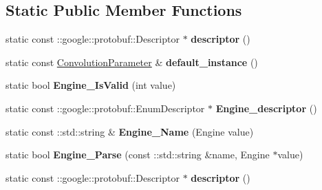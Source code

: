 \subsection*{Static Public Member Functions}
\begin{DoxyCompactItemize}
\item 
\mbox{\label{classcaffe_1_1_convolution_parameter_aff287042d46a7801d37412e6552ec762}} 
static const \+::google\+::protobuf\+::\+Descriptor $\ast$ {\bfseries descriptor} ()
\item 
\mbox{\label{classcaffe_1_1_convolution_parameter_a5b99741cbe94b140c5499713cdbb4c7e}} 
static const \mbox{\hyperlink{classcaffe_1_1_convolution_parameter}{Convolution\+Parameter}} \& {\bfseries default\+\_\+instance} ()
\item 
\mbox{\label{classcaffe_1_1_convolution_parameter_a19b2ca3da6c78edc6a7cdc7eee884a73}} 
static bool {\bfseries Engine\+\_\+\+Is\+Valid} (int value)
\item 
\mbox{\label{classcaffe_1_1_convolution_parameter_a23a4f2961e4f9f02ca0d27d39406fd69}} 
static const \+::google\+::protobuf\+::\+Enum\+Descriptor $\ast$ {\bfseries Engine\+\_\+descriptor} ()
\item 
\mbox{\label{classcaffe_1_1_convolution_parameter_a991bf0ab43a54ce655215f5942dfad9f}} 
static const \+::std\+::string \& {\bfseries Engine\+\_\+\+Name} (Engine value)
\item 
\mbox{\label{classcaffe_1_1_convolution_parameter_a047082beef073728bf3b23604a20d64a}} 
static bool {\bfseries Engine\+\_\+\+Parse} (const \+::std\+::string \&name, Engine $\ast$value)
\item 
\mbox{\label{classcaffe_1_1_convolution_parameter_a66a45d65f4cf37b036c66d5b48e321f1}} 
static const \+::google\+::protobuf\+::\+Descriptor $\ast$ {\bfseries descriptor} ()
\item 
\mbox{\label{classcaffe_1_1_convolution_parameter_afa3a4cf3621c64637dca70834d72287c}} 

\end{DoxyCompactItemize}
